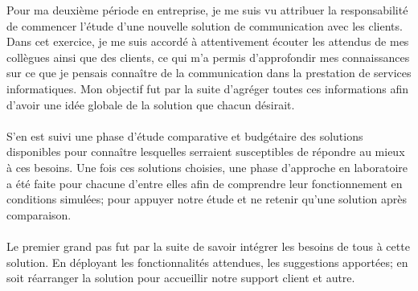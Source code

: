 \begin{resumo}
    Pour ma deuxième période en entreprise, je me suis vu attribuer la responsabilité de commencer l'étude d'une nouvelle solution de communication avec les clients. Dans cet exercice, je me suis accordé à attentivement écouter les attendus de mes collègues ainsi que des clients, ce qui m'a permis d'approfondir mes connaissances sur ce que je pensais connaître de la communication dans la prestation de services informatiques. Mon objectif fut par la suite d'agréger toutes ces informations afin d'avoir une idée globale de la solution que chacun désirait.
    \\ \\
    S'en est suivi une phase d'étude comparative et budgétaire des solutions disponibles pour connaître lesquelles serraient susceptibles de répondre au mieux à ces besoins. Une fois ces solutions choisies, une phase d'approche en laboratoire a été faite pour chacune d'entre elles afin de comprendre leur fonctionnement en conditions simulées; pour appuyer notre étude et ne retenir qu'une solution après comparaison.
    \\ \\
    Le premier grand pas fut par la suite de savoir intégrer les besoins de tous à cette solution. En déployant les fonctionnalités attendues, les suggestions apportées; en soit réarranger la solution pour accueillir notre support client et autre.
    
\end{resumo}